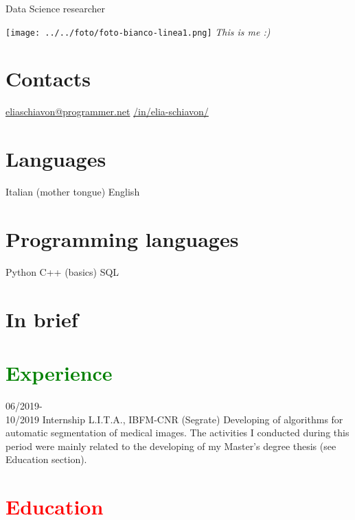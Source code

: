 \documentclass[a4paper]{friggeri-cv}
\begin{document}
       {Data Science researcher}



\begin{aside}
	{\texttt{[image: ../../foto/foto-bianco-linea1.png]}
	\textit{This is me :)}\phantom{xxx}}
  \section{Contacts}
    {\color{gray}{\FA \faEnvelope}} \href{mailto:eliaschiavon@programmer.net}{eliaschiavon@programmer.net}
    {\color{cyan}{\FA \faLinkedinSquare}} \href{https://www.linkedin.com/in/elia-schiavon/}{/in/elia-schiavon/}
  \section{Languages}
    Italian (mother tongue)
    English
  \section{Programming languages}
	Python
	C++ (basics)
	SQL
\end{aside}

\section{In brief}

\section{\textcolor{green}{Experience}}

\begin{entrylist}
	\entry
	{06/2019-\\10/2019}
	{Internship}
	{L.I.T.A., IBFM-CNR (Segrate)}
	{Developing of algorithms for automatic segmentation of medical images. The activities I conducted during this period were mainly related to the developing of my Master's degree thesis (see Education section).}
\end{entrylist}

\section{\textcolor{red}{Education}}
\end{document}
